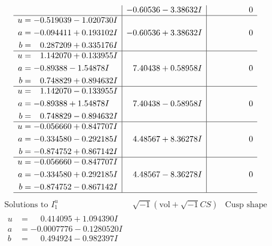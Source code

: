 \documentclass[1p]{elsarticle_modified}
\theoremstyle{definition}
\newcommand{\I}{\sqrt{-1}}
\begin{document}
$$\begin{array}{c|c|c}
 & -0.60536 - 3.38632 I & \phantom{-0.000000 } 0 \\ \hline\begin{aligned}
u &= -0.519039 - 1.020730 I \\
a &= -0.094411 + 0.193102 I \\
b &= \phantom{-}0.287209 + 0.335176 I\end{aligned}
 & -0.60536 + 3.38632 I & \phantom{-0.000000 } 0 \\ \hline\begin{aligned}
u &= \phantom{-}1.142070 + 0.133955 I \\
a &= -0.89388 - 1.54878 I \\
b &= \phantom{-}0.748829 + 0.894632 I\end{aligned}
 & \phantom{-}7.40438 + 0.58958 I & \phantom{-0.000000 } 0 \\ \hline\begin{aligned}
u &= \phantom{-}1.142070 - 0.133955 I \\
a &= -0.89388 + 1.54878 I \\
b &= \phantom{-}0.748829 - 0.894632 I\end{aligned}
 & \phantom{-}7.40438 - 0.58958 I & \phantom{-0.000000 } 0 \\ \hline\begin{aligned}
u &= -0.056660 + 0.847707 I \\
a &= -0.334580 - 0.292185 I \\
b &= -0.874752 + 0.867142 I\end{aligned}
 & \phantom{-}4.48567 + 8.36278 I & \phantom{-0.000000 } 0 \\ \hline\begin{aligned}
u &= -0.056660 - 0.847707 I \\
a &= -0.334580 + 0.292185 I \\
b &= -0.874752 - 0.867142 I\end{aligned}
 & \phantom{-}4.48567 - 8.36278 I & \phantom{-0.000000 } 0\\
 \hline 
 \end{array}$$\newpage$$\begin{array}{c|c|c}  
\text{Solutions to }I^u_{1}& \I (\text{vol} + \sqrt{-1}CS) & \text{Cusp shape}\\
 \hline 
\begin{aligned}
u &= \phantom{-}0.414095 + 1.094390 I \\
a &= -0.0007776 - 0.1280520 I \\
b &= \phantom{-}0.494924 - 0.982397 I\end{aligned}

\end{array}$$
\end{document}
